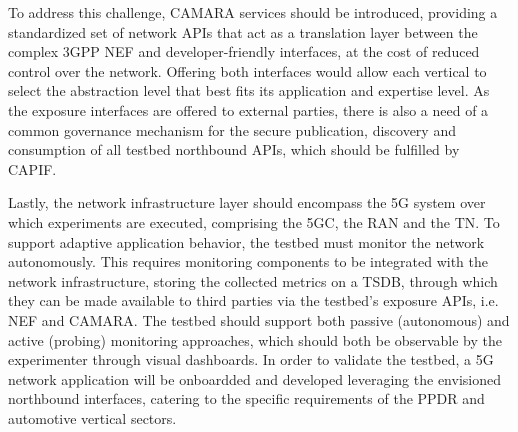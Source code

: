 To address this challenge, CAMARA services should be introduced, providing a standardized set of network \acsp{API} that act as a translation layer between the complex \acs{3GPP} \acs{NEF} and developer-friendly interfaces, at the cost of reduced control over the network. Offering both interfaces would allow each vertical to select the abstraction level that best fits its application and expertise level. As the exposure interfaces are offered to external parties, there is also a need of a common governance mechanism for the secure publication, discovery and consumption of all testbed northbound \acsp{API}, which should be fulfilled by \acs{CAPIF}.

Lastly, the network infrastructure layer should encompass the \acs{5G} system over which experiments are executed, comprising the \acs{5GC}, the \acs{RAN} and the \acs{TN}. To support adaptive application behavior, the testbed must monitor the network autonomously. This requires monitoring components to be integrated with the network infrastructure, storing the collected metrics on a \ac{TSDB}, through which they can be made available to third parties via the testbed's exposure \acsp{API}, i.e. \acs{NEF} and CAMARA. The testbed should support both passive (autonomous) and active (probing) monitoring approaches, which should both be observable by the experimenter through visual dashboards. In order to validate the testbed, a \acs{5G} network application will be onboardded and developed leveraging the envisioned northbound interfaces, catering to the specific requirements of the \acs{PPDR} and automotive vertical sectors.
